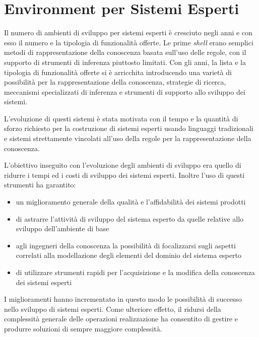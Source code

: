 \chapter{Environment per Sistemi Esperti}
Il numero di ambienti di sviluppo per sistemi esperti è cresciuto negli anni e con esso il numero e la tipologia di funzionalità offerte. Le prime \emph{shell} erano semplici metodi di rappresentazione della conoscenza basata sull'uso delle regole, con il supporto di strumenti di inferenza piuttosto limitati. Con gli anni, la lista e la tipologia di funzionalità offerte si è arricchita introducendo una varietà di possibilità per la rappresentazione della conoscenza, strategie di ricerca, meccanismi specializzati di inferenza e strumenti di supporto allo sviluppo dei sistemi.

L'evoluzione di questi sistemi è stata motivata con il tempo e la quantità di sforzo richiesto per la costruzione di sistemi esperti usando linguaggi tradizionali e sistemi strettamente vincolati all'uso della regole per la rappresentazione della conoscenza.

L'obiettivo inseguito con l'evoluzione degli ambienti di sviluppo era quello di ridurre i tempi ed i costi di sviluppo dei sistemi esperti. Inoltre l'uso di questi strumenti ha garantito:
\begin{itemize}
	\item un miglioramento generale della qualità e l'affidabilità dei sistemi prodotti
	\item di astrarre l'attività di sviluppo del sistema esperto da quelle relative allo sviluppo dell'ambiente di base
	\item agli ingegneri della conoscenza la possibilità di focalizzarsi sugli aspetti correlati alla modellazione degli elementi del dominio del sistema esperto
	\item di utilizzare strumenti rapidi per l'acquisizione e la modifica della conoscenza dei sistemi esperti
\end{itemize}

I miglioramenti hanno incrementato in questo modo le possibilità di successo nello sviluppo di sistemi esperti. Come ulteriore effetto, il ridursi della complessità generale delle operazioni realizzazione ha consentito di gestire e produrre soluzioni di sempre maggiore complessità.

